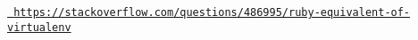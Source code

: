
\begin{DoxyCode}{0}

\end{DoxyCode}


\href{https://stackoverflow.com/questions/486995/ruby-equivalent-of-virtualenv}{\texttt{ https\+://stackoverflow.\+com/questions/486995/ruby-\/equivalent-\/of-\/virtualenv}} 